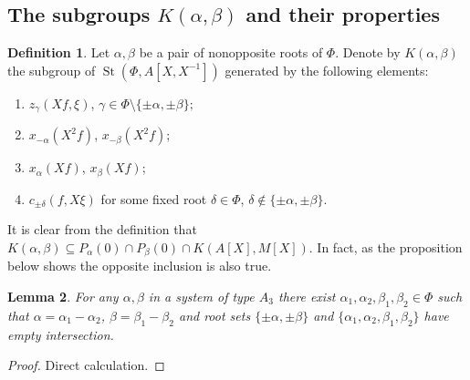 \documentclass[oneside, 8pt]{amsart}
\newtheorem{lemma}{Lemma}
\theoremstyle{remark}
\theoremstyle{definition}
\newtheorem{df}[lemma]{Definition} \Crefname{df}{Definition}{Definitions}
\DeclareMathOperator{\St}{St}
\numberwithin{equation}{section}
\begin{document}
\begin{comment}
\begin{lemma} If $\alpha - \beta \in \Phi$ then for all $g \in \St(\Phi, R[X], XM[X])$ holds $S_\alpha(a, g) \in P_\beta(0)$. \end{lemma}
\begin{proof}
It suffices to verify the assertion for the generators $z_\gamma(Xf, g)$, $\gamma \in \Phi$.
By our assumption $(\alpha, \beta) \geq 0$. 
\end{proof}
\end{comment}

\subsection{The subgroups $K(\alpha, \beta)$ and their properties}
\begin{df}
 Let $\alpha, \beta$ be a pair of nonopposite roots of $\Phi$. Denote by $K(\alpha, \beta)$ the subgroup of $\St(\Phi, A[X, X^{-1}])$ 
 generated by the following elements:
 \begin{enumerate}
  \item $z_\gamma(Xf, \xi)$, $\gamma \in \Phi \setminus\{ \pm \alpha, \pm \beta\};$
  \item $x_{-\alpha}(X^2f)$, $x_{-\beta}(X^2f)$;
  \item $x_{\alpha}(Xf)$, $x_\beta(Xf)$;
  \item $c_{\pm \delta}(f, X\xi)$ for some fixed root $\delta \in \Phi$, $\delta \not \in \{ \pm \alpha, \pm \beta \}$.
 \end{enumerate}
\end{df}
It is clear from the definition that $K(\alpha, \beta) \subseteq P_\alpha(0) \cap P_\beta(0) \cap K(A[X], M[X])$.
In fact, as the proposition below shows the opposite inclusion is also true.

\begin{lemma} \label{root-lemma}
 For any $\alpha, \beta$ in a system of type $A_3$ there exist $\alpha_1, \alpha_2, \beta_1, \beta_2 \in \Phi$ such that
 $\alpha = \alpha_1 - \alpha_2$, $\beta = \beta_1 - \beta_2$ and root sets $\{ \pm \alpha, \pm \beta \}$ and $\{ \alpha_1, \alpha_2, \beta_1, \beta_2 \}$ have empty intersection.
\end{lemma}
\begin{proof} Direct calculation. \end{proof}
\end{document}
